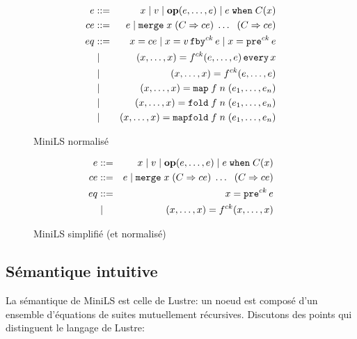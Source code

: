 \documentclass[a4paper]{article}
\newcommand{\lustre}{{\sc Lustre}}
\newcommand{\minils}{{\sc MiniLS}}
\newcommand{\p}[0]{\; \vert \;}
\newcommand{\mybox}[1]{\mbox{\tt{#1}}}
\newcommand{\Coloneqq}[0]{::=}
\newcommand{\Op}[2]{\mybox{\bf{op}}(#1,\dots,#2)}
\newcommand{\Fby}[2]{#1 \, \mybox{fby}^{ck} \, #2}
\newcommand{\Pre}[1]{\mybox{pre}^{ck} \, #1}
\newcommand{\Every}[4]{#1^{ck}(#2,\dots,#3) \, \mybox{every} \, #4}
\newcommand{\App}[2]{#1^{ck}(#2)}
\newcommand{\When}[3]{#1 \; \mybox{when} \; #2(#3)}
\newcommand{\Merge}[5]{\mybox{merge} \; #1 \; (#2 \Rightarrow #3) \; \dots \; \
  (#4 \Rightarrow #5)}
\newcommand{\Map}[3]{\mathtt{map} \; #1\; n\; (#2,\dots,#3)}
\newcommand{\Fold}[3]{\mathtt{fold} \; #1\; n\; (#2,\dots,#3)}
\newcommand{\Mapfold}[3]{\mathtt{mapfold} \; #1\; n\; (#2,\dots,#3)}
\begin{document}
\begin{figure}[htp]
  \centering
  \begin{eqnarray*}
    e & \Coloneqq & x \p v \p \Op{e}{e} \p \When{e}{C}{x} \\
    ce & \Coloneqq & e \p \Merge{x}{C}{ce}{C}{ce} \\
    eq & \Coloneqq & x = ce \p x = \Fby{v}{e} \p x = \Pre{e} \\
    & \p & (x,\dots,x) = \Every{f}{e}{e}{x} \\
    & \p & (x,\dots,x) = \App{f}{e,\dots,e} \\
    & \p & (x,\dots,x) = \Map{f}{e_1}{e_n} \\
    & \p & (x,\dots,x) = \Fold{f}{e_1}{e_n} \\
    & \p & (x,\dots,x) = \Mapfold{f}{e_1}{e_n}
  \end{eqnarray*}
  \caption{\minils{} normalis\'e}
  \label{fig:mlsn}
\end{figure}

\begin{figure}[htp]
  \centering
  \begin{eqnarray*}
    e & \Coloneqq & x \p v \p \Op{e}{e} \p \When{e}{C}{x} \\
    ce & \Coloneqq & e \p \Merge{x}{C}{ce}{C}{ce} \\
    eq & \Coloneqq & x = \Pre{e} \\
    & \p & (x,\dots,x) = \App{f}{x,\dots,x}
  \end{eqnarray*}
  \caption{\minils{} simplifi\'e (et normalis\'e)}
  \label{fig:mlsns}
\end{figure}

\subsection{S\'emantique intuitive}
La s\'emantique de \minils{} est celle de \lustre: un noeud est compos\'e
d'un ensemble d'\'equa\-tions de suites mutuellement r\'ecursives. Discutons
des points qui distinguent le langage de \lustre:
\end{document}
